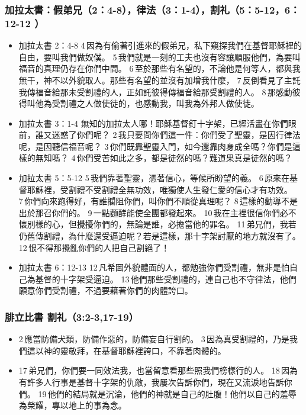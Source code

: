  \subsubsection{加拉太書：假弟兄（2：4-8），律法（3：1-4），割礼（5：5-12，6：12-12 ） } 
 \begin{itemize}
 \itemsep-.25em
\item 加拉太書 2：4-8
  4 因為有偷著引進來的假弟兄，私下窺探我們在基督耶穌裡的自由，要叫我們做奴僕。 5 我們就是一刻的工夫也沒有容讓順服他們，為要叫福音的真理仍存在你們中間。 6 至於那些有名望的，不論他是何等人，都與我無干，神不以外貌取人。那些有名望的並沒有加增我什麼， 7 反倒看見了主託我傳福音給那未受割禮的人，正如託彼得傳福音給那受割禮的人。 8 那感動彼得叫他為受割禮之人做使徒的，也感動我，叫我為外邦人做使徒。
\item  加拉太書 3：1-4
 無知的加拉太人哪！耶穌基督釘十字架，已經活畫在你們眼前，誰又迷惑了你們呢？ 2 我只要問你們這一件：你們受了聖靈，是因行律法呢，是因聽信福音呢？ 3 你們既靠聖靈入門，如今還靠肉身成全嗎？你們是這樣的無知嗎？ 4 你們受苦如此之多，都是徒然的嗎？難道果真是徒然的嗎？
 \item 加拉太書 5：5-12
  5 我們靠著聖靈，憑著信心，等候所盼望的義。 6 原來在基督耶穌裡，受割禮不受割禮全無功效，唯獨使人生發仁愛的信心才有功效。 7 你們向來跑得好，有誰攔阻你們，叫你們不順從真理呢？ 8 這樣的勸導不是出於那召你們的。 9 一點麵酵能使全團都發起來。 10 我在主裡很信你們必不懷別樣的心，但攪擾你們的，無論是誰，必擔當他的罪名。 11 弟兄們，我若仍舊傳割禮，為什麼還受逼迫呢？若是這樣，那十字架討厭的地方就沒有了。 12 恨不得那攪亂你們的人把自己割絕了！
\item 加拉太書 6：12-13 
   12 凡希圖外貌體面的人，都勉強你們受割禮，無非是怕自己為基督的十字架受逼迫。 13 他們那些受割禮的，連自己也不守律法，他們願意你們受割禮，不過要藉著你們的肉體誇口。
  \end{itemize}
 
  \subsubsection{腓立比書  割礼（3:2-3,17-19） } 
  \begin{itemize}
 \itemsep-.25em
\item  2 應當防備犬類，防備作惡的，防備妄自行割的。 3 因為真受割禮的，乃是我們這以神的靈敬拜，在基督耶穌裡誇口，不靠著肉體的。
 \item 17 弟兄們，你們要一同效法我，也當留意看那些照我們榜樣行的人。 18 因為有許多人行事是基督十字架的仇敵，我屢次告訴你們，現在又流淚地告訴你們。 19 他們的結局就是沉淪，他們的神就是自己的肚腹！他們以自己的羞辱為榮耀，專以地上的事為念。
 \end{itemize}
 
